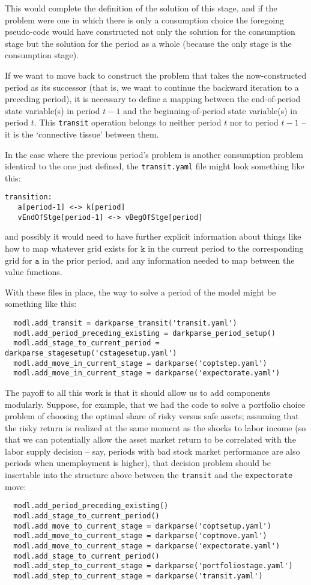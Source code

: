 \documentclass[SolvingMicroDSOPs]{subfiles}
\begin{document}
This would complete the definition of the solution of this stage, and if the problem were one in which there is only a consumption choice the foregoing pseudo-code would have constructed not only the solution for the consumption stage but the solution for the period as a whole (because the only stage is the consumption stage).

If we want to move back to construct the problem that takes the now-constructed period as its successor (that is, we want to continue the backward iteration to a preceding period), it is necessary to define a mapping between the end-of-period state variable(s) in period $t-1$ and the beginning-of-period state variable(s) in period $t$.  This \texttt{transit} operation belongs to neither period $t$ nor to period $t-1$ -- it is the `connective tissue' between them.

In the case where the previous period's problem is another consumption problem identical to the one just defined, the \texttt{transit.yaml} file might look something like this:
\begin{verbatim}
transition:
   a[period-1] <-> k[period]
   vEndOfStge[period-1] <-> vBegOfStge[period]
\end{verbatim}
and possibly it would need to have further explicit information about things like how to map whatever grid exists for $\texttt{k}$ in the current period to the corresponding grid for $\texttt{a}$ in the prior period, and any information needed to map between the value functions.

With these files in place, the way to solve a period of the model might be something like this:
\begin{verbatim}
  modl.add_transit = darkparse_transit('transit.yaml')
  modl.add_period_preceding_existing = darkparse_period_setup()
  modl.add_stage_to_current_period = darkparse_stagesetup('cstagesetup.yaml')
  modl.add_move_in_current_stage = darkparse('coptstep.yaml')
  modl.add_move_in_current_stage = darkparse('expectorate.yaml')
\end{verbatim}

The payoff to all this work is that it should allow us to add components modularly.  Suppose, for example, that we had the code to solve a portfolio choice problem of choosing the optimal share of risky versus safe assets; assuming that the risky return is realized at the same moment as the shocks to labor income (so that we can potentially allow the asset market return to be correlated with the labor supply decision -- say, periods with bad stock market performance are also periods when unemployment is higher), that decision problem should be insertable into the structure above between the \texttt{transit} and the \texttt{expectorate} move:
\begin{verbatim}
  modl.add_period_preceding_existing()
  modl.add_stage_to_current_period()
  modl.add_move_to_current_stage = darkparse('coptsetup.yaml')
  modl.add_move_to_current_stage = darkparse('coptmove.yaml')
  modl.add_move_to_current_stage = darkparse('expectorate.yaml')
  modl.add_stage_to_current_period()
  modl.add_step_to_current_stage = darkparse('portfoliostage.yaml')
  modl.add_step_to_current_stage = darkparse('transit.yaml')
\end{verbatim}
\end{document}
